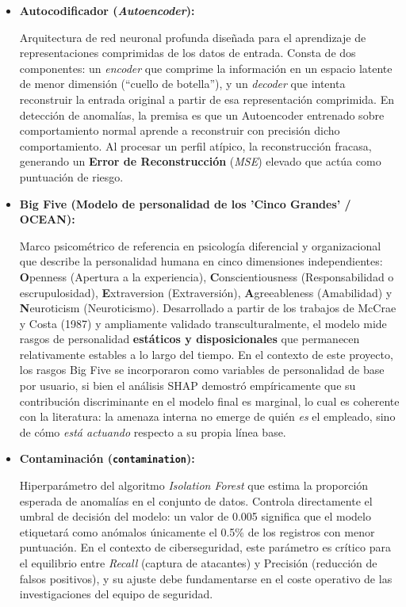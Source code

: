 \documentclass[IB]{TFUOC}%
\begin{document}
\begin{itemize}
    \item \textbf{Autocodificador (\textit{Autoencoder}):}
    
    Arquitectura de red neuronal profunda diseñada para el aprendizaje de representaciones comprimidas de los datos de entrada. Consta de dos componentes: un \textit{encoder} que comprime la información en un espacio latente de menor dimensión (``cuello de botella''), y un \textit{decoder} que intenta reconstruir la entrada original a partir de esa representación comprimida. En detección de anomalías, la premisa es que un Autoencoder entrenado sobre comportamiento normal aprende a reconstruir con precisión dicho comportamiento. Al procesar un perfil atípico, la reconstrucción fracasa, generando un \textbf{Error de Reconstrucción} (\textit{MSE}) elevado que actúa como puntuación de riesgo.

    \item \textbf{Big Five (Modelo de personalidad de los 'Cinco Grandes' / OCEAN):}
    
    Marco psicométrico de referencia en psicología diferencial y organizacional que describe la personalidad humana en cinco dimensiones independientes: \textbf{O}penness (Apertura a la experiencia), \textbf{C}onscientiousness (Responsabilidad o escrupulosidad), \textbf{E}xtraversion (Extraversión), \textbf{A}greeableness (Amabilidad) y \textbf{N}euroticism (Neuroticismo). Desarrollado a partir de los trabajos de McCrae y Costa (1987) y ampliamente validado transculturalmente, el modelo mide rasgos de personalidad \textbf{estáticos y disposicionales} que permanecen relativamente estables a lo largo del tiempo. En el contexto de este proyecto, los rasgos Big Five se incorporaron como variables de personalidad de base por usuario, si bien el análisis SHAP demostró empíricamente que su contribución discriminante en el modelo final es marginal, lo cual es coherente con la literatura: la amenaza interna no emerge de quién \textit{es} el empleado, sino de cómo \textit{está actuando} respecto a su propia línea base.

    \item \textbf{Contaminación (\texttt{contamination}):}
    
    Hiperparámetro del algoritmo \textit{Isolation Forest} que estima la proporción esperada de anomalías en el conjunto de datos. Controla directamente el umbral de decisión del modelo: un valor de 0.005 significa que el modelo etiquetará como anómalos únicamente el 0.5\% de los registros con menor puntuación. En el contexto de ciberseguridad, este parámetro es crítico para el equilibrio entre \textit{Recall} (captura de atacantes) y Precisión (reducción de falsos positivos), y su ajuste debe fundamentarse en el coste operativo de las investigaciones del equipo de seguridad.



\end{itemize}
\end{document}
